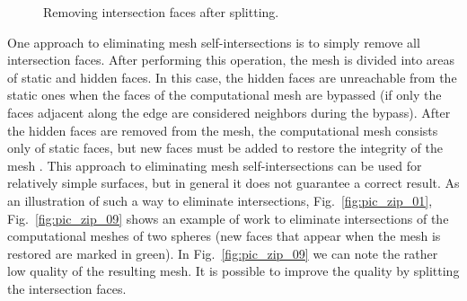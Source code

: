 \documentclass[
11pt,%
tightenlines,%
twoside,%
onecolumn,%
nofloats,%
nobibnotes,%
nofootinbib,%
superscriptaddress,%
noshowpacs,%
centertags]%
{revtex4-2}
\begin{document}
\begin{figure}[h]
\begin{minipage}[h]{0.3\textwidth}
    \caption{Removing intersection faces after splitting.}\label{fig:pic_zip_15}
  \end{minipage}
\end{figure}

One approach to eliminating mesh self-intersections is to simply remove all intersection faces.
After performing this operation, the mesh is divided into areas of static and hidden faces.
In this case, the hidden faces are unreachable from the static ones when the faces of the computational mesh are bypassed (if only the faces adjacent along the edge are considered neighbors during the bypass).
After the hidden faces are removed from the mesh, the computational mesh consists only of static faces, but new faces must be added to restore the integrity of the mesh \cite{Charton}.
This approach to eliminating mesh self-intersections can be used for relatively simple surfaces, but in general it does not guarantee a correct result.
As an illustration of such a way to eliminate intersections, Fig.~\ref{fig:pic_zip_01}, Fig.~\ref{fig:pic_zip_09} shows an example of work to eliminate intersections of the computational meshes of two spheres (new faces that appear when the mesh is restored are marked in green).
In Fig.~\ref{fig:pic_zip_09} we can note the rather low quality of the resulting mesh.
It is possible to improve the quality by splitting the intersection faces.
\end{document}
